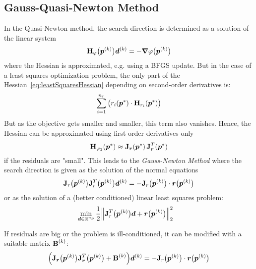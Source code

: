 		\subsection{Gauss-Quasi-Newton Method}
			In the Quasi-Newton method, the search direction is determined as a solution of the linear system
			\begin{align*}
				\bm{\mathrm{H}}_\varphi\big(\bm{p}^{(k)}\big) \bm{d}^{(k)} = -\grad{\varphi}\big(\bm{p}^{(k)}\big)
			\end{align*}
			where the Hessian is approximated, e.g. using a BFGS update. But in the case of a least squares optimization problem, the only part of the Hessian~\eqref{eq:leastSquaresHessian} depending on second-order derivatives is:
			\begin{align*}
				\sum_{i = 1}^{n_r} \big( r_i(\bm{p}^\ast) \cdot \bm{\mathrm{H}}_{r_i}(\bm{p}^\ast) \big)
			\end{align*}
			But as the objective gets smaller and smaller, this term also vanishes. Hence, the Hessian can be approximated using first-order derivatives only
			\begin{align*}
				\bm{\mathrm{H}}_{\varphi_2}(\bm{p}^\ast) \approx \bm{\mathrm{J}}_{\bm{r}}(\bm{p}^\ast) \, \bm{\mathrm{J}}_{\bm{r}}^T(\bm{p}^\ast)
			\end{align*}
			if the residuals are "small". This leads to the \emph{Gauss-Newton Method} where the search direction is given as the solution of the normal equations
			\begin{align*}
				\bm{\mathrm{J}}_r\big(\bm{p}^{(k)}\big) \bm{\mathrm{J}}_r^T\big(\bm{p}^{(k)}\big) \bm{d}^{(k)} = -\bm{\mathrm{J}}_r\big(\bm{p}^{(k)}\big) \cdot \bm{r}\big(\bm{p}^{(k)}\big)
			\end{align*}
			or as the solution of a (better conditioned) linear least squares problem:
			\begin{align*}
				\min_{\bm{d} \in \mathbb{R}^{n_p}} & \, \frac{1}{2} \Big\lVert \bm{\mathrm{J}}_r^T\big(\bm{p}^{(k)}\big) \bm{d} + \bm{r}\big(\bm{p}^{(k)}\big) \Big\rVert_2^2
			\end{align*}

			If residuals are big or the problem is ill-conditioned, it can be modified with a suitable matrix \( \bm{\mathrm{B}}^{(k)} \):
			\begin{align*}
				\Big( \bm{\mathrm{J}}_{\bm{r}}\big(\bm{p}^{(k)}\big) \bm{\mathrm{J}}_{\bm{r}}^T\big(\bm{p}^{(k)}\big) + \bm{\mathrm{B}}^{(k)} \Big) \bm{d}^{(k)} = -\bm{\mathrm{J}}_r\big(\bm{p}^{(k)}\big) \cdot \bm{r}\big(\bm{p}^{(k)}\big)
			\end{align*}

